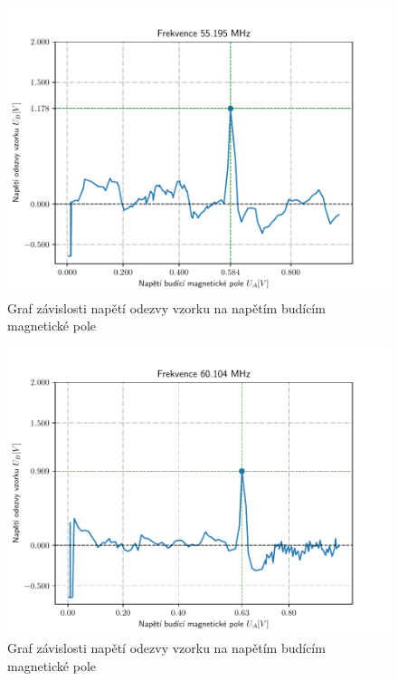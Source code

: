 \documentclass{article}
\begin{document}
\clearpage
\begin{figure}[!h]
  \hspace*{-10em}
  \includegraphics[scale=1.2]{figs/3.pdf}
  \caption{Graf závislosti napětí odezvy vzorku na napětím budícím magnetické pole}
\end{figure}
\clearpage
\begin{figure}[!h]
  \hspace*{-10em}
  \includegraphics[scale=1.2]{figs/4.pdf}
  \caption{Graf závislosti napětí odezvy vzorku na napětím budícím magnetické pole}
\end{figure}
\clearpage
\end{document}
